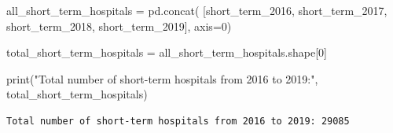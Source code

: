 \documentclass[
  letterpaper,
  DIV=11,
  numbers=noendperiod]{scrartcl}
\newenvironment{Shaded}{\begin{snugshade}}{\end{snugshade}}
\newcommand{\BuiltInTok}[1]{\textcolor[rgb]{0.00,0.23,0.31}{#1}}
\newcommand{\DecValTok}[1]{\textcolor[rgb]{0.68,0.00,0.00}{#1}}
\newcommand{\NormalTok}[1]{\textcolor[rgb]{0.00,0.23,0.31}{#1}}
\newcommand{\OperatorTok}[1]{\textcolor[rgb]{0.37,0.37,0.37}{#1}}
\newcommand{\StringTok}[1]{\textcolor[rgb]{0.13,0.47,0.30}{#1}}
\begin{document}
\begin{Shaded}
\begin{Highlighting}[]
\NormalTok{all\_short\_term\_hospitals }\OperatorTok{=}\NormalTok{ pd.concat(}
\NormalTok{    [short\_term\_2016, short\_term\_2017, short\_term\_2018, short\_term\_2019], axis}\OperatorTok{=}\DecValTok{0}\NormalTok{)}

\NormalTok{total\_short\_term\_hospitals }\OperatorTok{=}\NormalTok{ all\_short\_term\_hospitals.shape[}\DecValTok{0}\NormalTok{]}

\BuiltInTok{print}\NormalTok{(}\StringTok{"Total number of short{-}term hospitals from 2016 to 2019:"}\NormalTok{,}
\NormalTok{      total\_short\_term\_hospitals)}
\end{Highlighting}
\end{Shaded}

\begin{verbatim}
Total number of short-term hospitals from 2016 to 2019: 29085
\end{verbatim}
\end{document}
